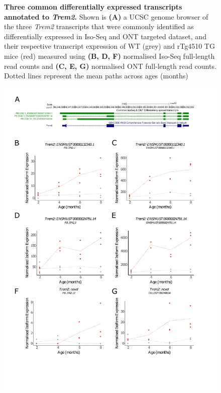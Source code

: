 \begin{figure}[htp]
	\captionsetup{width=0.95\textwidth}
	\label{fig:diffcommon_1}
	\caption[Three common differentially expressed transcripts annotated to \textit{Trem2}]%
	{\textbf{Three common differentially expressed transcripts annotated to \textit{Trem2}.} Shown is \textbf{(A)} a UCSC genome browser of the three \textit{Trem2} transcripts that were commonly identified as differentially expressed in Iso-Seq and ONT targeted dataset, and their respective transcript expression of WT (grey) and rTg4510 TG mice (red) measured using \textbf{(B, D, F)} normalised Iso-Seq full-length read counts and \textbf{(C, E, G)} normalised ONT full-length read counts. Dotted lines represent the mean paths across ages (months)}   
\end{figure}

\begin{figure}[htp]
	\centering
	\includegraphics[page=2,trim={0 0cm 0 0},scale =0.75]{Figures/DiffCommon.pdf}

\end{figure}
